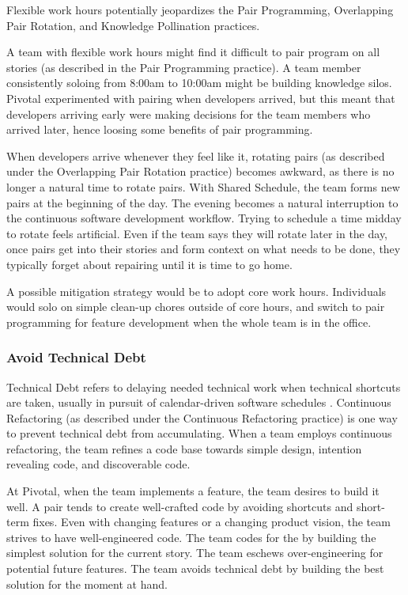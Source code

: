 \begin{table}[]
Flexible work hours potentially jeopardizes the Pair Programming, Overlapping Pair Rotation, and Knowledge Pollination practices. 

A team with flexible work hours might find it difficult to pair program on all stories (as described in the Pair Programming practice). A team member consistently soloing from 8:00am to 10:00am might be building knowledge silos. Pivotal experimented with pairing when developers arrived, but this meant that developers arriving early were making decisions for the team members who arrived later, hence loosing some benefits of pair programming. 

When developers arrive whenever they feel like it, rotating pairs (as described under the Overlapping Pair Rotation practice) becomes awkward, as there is no longer a natural time to rotate pairs. With Shared Schedule, the team forms new pairs at the beginning of the day. The evening becomes a natural interruption to the continuous software development workflow. Trying to schedule a time midday to rotate feels artificial. Even if the team says they will rotate later in the day, once pairs get into their stories and form context on what needs to be done, they typically forget about repairing until it is time to go home.

A possible mitigation strategy would be to adopt core work hours. Individuals would solo on simple clean-up chores outside of core hours, and switch to pair programming for feature development when the whole team is in the office. 

\subsubsection{Avoid Technical Debt}

Technical Debt refers to delaying needed technical work when technical shortcuts are taken, usually in pursuit of calendar-driven software schedules \cite{McConnellTechnicalDebt}.  Continuous Refactoring (as described under the Continuous Refactoring practice) is one way to prevent technical debt from accumulating. When a team employs continuous refactoring, the team refines a code base towards simple design, intention revealing code, and discoverable code. 

At Pivotal, when the team implements a feature, the team desires to build it well. A pair tends to create well-crafted code by avoiding shortcuts and short-term fixes. Even with changing features or a changing product vision, the team strives to have well-engineered code. The team codes for the  by building the simplest solution for the current story. The team eschews over-engineering for potential future features. The team avoids technical debt by building the best solution for the moment at hand.  


\end{table}
